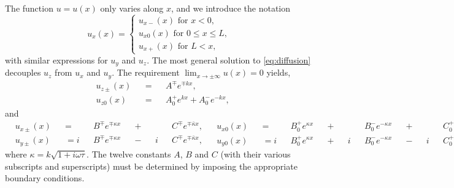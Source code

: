The function $u = u(x)$ only varies along $x$,
and we introduce the notation
\begin{equation}
  u_x (x) =
    \begin{cases}
      u_{x-} (x) \text{ for } x < 0     , \\
      u_{x0} (x) \text{ for } 0 ≤ x ≤ L , \\
      u_{x+} (x) \text{ for }     L < x ,
    \end{cases}
\end{equation}
with similar expressions for $u_y$ and $u_z$.
The most general solution to \cref{eq:diffusion} decouples $u_z$ from $u_x$ and $u_y$.
The requirement $\lim_{x → ± ∞} u(x) = 0$ yields,
\begin{subequations}
  \begin{alignat}{3}
    & u_{z±} (x) && {}={} && A^∓ e^{∓ k x}                     , \\
    & u_{z0} (x) && {}={} && A_0^+ e^{k x} {}+{} A_0^- e^{-k x} ,
  \end{alignat}
\end{subequations}
and
\begin{subequations}
  \begin{alignat}{6}
    & u_{x±} (x) && =   && B^∓ e^{∓ κ x} && {}+{} &&   && C^∓ e^{∓ \bar{κ} x} , \\
    & u_{y±} (x) && = i && B^∓ e^{∓ κ x} && {}-{} && i && C^∓ e^{∓ \bar{κ} x} ,
  \end{alignat}
  \begin{alignat}{12}
    & u_{x0} (x) && =   && B_0^+ e^{κ x} && {}+{} &&   && B_0^- e^{- κ x} && {}+{} &&   && C_0^+ e^{ \bar{κ} x } && {}+{} &&   && C_0^- e^{ - \bar{κ} x } , \\
    & u_{y0} (x) && = i && B_0^+ e^{κ x} && {}+{} && i && B_0^- e^{- κ x} && {}-{} && i && C_0^+ e^{ \bar{κ} x } && {}-{} && i && C_0^- e^{ - \bar{κ} x } .
  \end{alignat}
\end{subequations}
where $κ = k \sqrt{1 + i ω τ}$.
The twelve constants $A$, $B$ and $C$ (with their various subscripts and superscripts) must be determined by imposing the appropriate boundary conditions.

